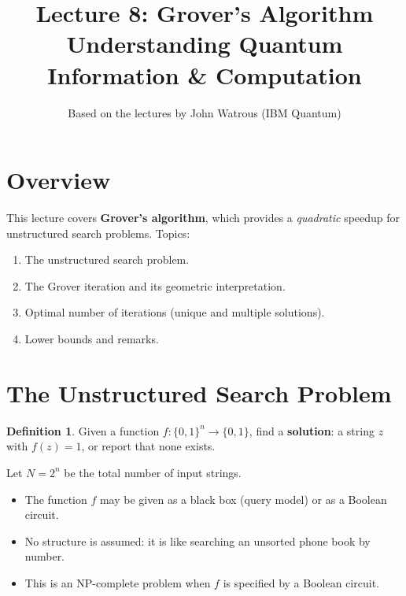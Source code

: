 \documentclass[11pt]{article}
\title{\textbf{Lecture 8: Grover's Algorithm} \\ \large Understanding Quantum Information \& Computation}
\author{Based on the lectures by John Watrous (IBM Quantum)}
\date{}
\theoremstyle{definition}
\newtheorem{definition}{Definition}[section]
\begin{document}
\maketitle
\tableofcontents
\newpage

\section{Overview}

This lecture covers \textbf{Grover's algorithm}, which provides a \emph{quadratic} speedup for unstructured search problems.  Topics:

\begin{enumerate}
    \item The unstructured search problem.
    \item The Grover iteration and its geometric interpretation.
    \item Optimal number of iterations (unique and multiple solutions).
    \item Lower bounds and remarks.
\end{enumerate}

\section{The Unstructured Search Problem}

\begin{definition}
Given a function $f:\{0,1\}^n\to\{0,1\}$, find a \textbf{solution}: a string $z$ with $f(z)=1$, or report that none exists.
\end{definition}

Let $N=2^n$ be the total number of input strings.

\begin{itemize}
    \item The function $f$ may be given as a black box (query model) or as a Boolean circuit.
    \item No structure is assumed: it is like searching an unsorted phone book by number.
    \item This is an NP-complete problem when $f$ is specified by a Boolean circuit.
\end{itemize}
\end{document}
